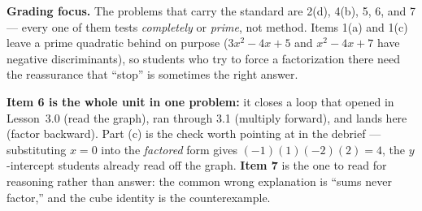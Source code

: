 \documentclass[10pt]{article}
\begin{document}
\begin{teachernote}
\textbf{Grading focus.} The problems that carry the standard are 2(d), 4(b), 5, 6, and 7 --- every
one of them tests \emph{completely} or \emph{prime}, not method. Items 1(a) and 1(c) leave a prime
quadratic behind on purpose ($3x^2-4x+5$ and $x^2-4x+7$ have negative discriminants), so students who
try to force a factorization there need the reassurance that ``stop'' is sometimes the right answer.

\vspace{3pt}
\textbf{Item 6 is the whole unit in one problem:} it closes a loop that opened in Lesson~3.0 (read the
graph), ran through 3.1 (multiply forward), and lands here (factor backward). Part (c) is the check
worth pointing at in the debrief --- substituting $x=0$ into the \emph{factored} form gives
$(-1)(1)(-2)(2)=4$, the $y$-intercept students already read off the graph. \textbf{Item 7} is the one
to read for reasoning rather than answer: the common wrong explanation is ``sums never factor,'' and
the cube identity is the counterexample.
\end{teachernote}
\end{document}
